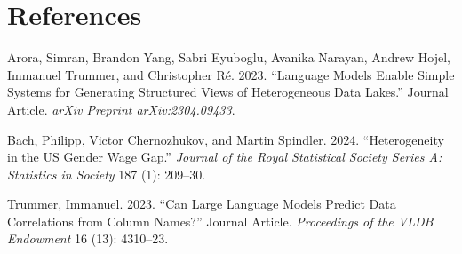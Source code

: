 \documentclass[
  11pt,
]{report}
\newlength{\cslhangindent}
\newenvironment{CSLReferences}[2] %
 {\begin{list}{}{%
  \setlength{\itemindent}{0pt}
  \setlength{\leftmargin}{0pt}
  \setlength{\parsep}{0pt}
  \ifodd #1
   \setlength{\leftmargin}{\cslhangindent}
   \setlength{\itemindent}{-1\cslhangindent}
  \fi
  \setlength{\itemsep}{#2\baselineskip}}}
 {\end{list}}
\begin{document}
\chapter*{References}\label{references}

\label{refs}
\begin{CSLReferences}{1}{0}
Arora, Simran, Brandon Yang, Sabri Eyuboglu, Avanika Narayan, Andrew
Hojel, Immanuel Trummer, and Christopher Ré. 2023. {``Language Models
Enable Simple Systems for Generating Structured Views of Heterogeneous
Data Lakes.''} Journal Article. \emph{arXiv Preprint arXiv:2304.09433}.

Bach, Philipp, Victor Chernozhukov, and Martin Spindler. 2024.
{``Heterogeneity in the US Gender Wage Gap.''} \emph{Journal of the
Royal Statistical Society Series A: Statistics in Society} 187 (1):
209--30.

Trummer, Immanuel. 2023. {``Can Large Language Models Predict Data
Correlations from Column Names?''} Journal Article. \emph{Proceedings of
the VLDB Endowment} 16 (13): 4310--23.

\end{CSLReferences}
\end{document}

